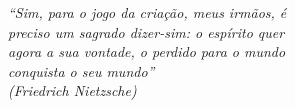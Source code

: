 \begin{epigrafe}
    \vspace*{\fill}
	\begin{flushright}
		\textit{``Sim, para o jogo da criação, meus irmãos, é\\
		preciso um sagrado dizer-sim: o espírito quer\\
		agora a sua vontade, o perdido para o mundo\\
		conquista o seu mundo''\\
		(Friedrich Nietzsche)}
	\end{flushright}
\end{epigrafe}
